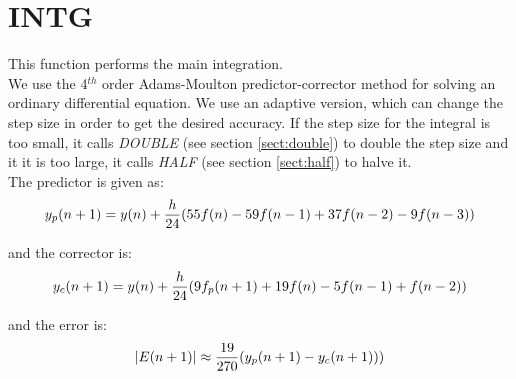 \section{INTG}
\label{sect:intg}

\noindent This function performs the main integration.\\


\noindent We use the 4$^{th}$ order Adams-Moulton predictor-corrector method
for solving an ordinary differential equation. We use an adaptive version,
which can change the step size in order to get the desired accuracy. If the
step size for the integral is too small, it calls {\em DOUBLE} (see section
\ref{sect:double}) to double the step size and it it is too large, it calls
{\em HALF} (see section \ref{sect:half}) to halve it.\\

\noindent The predictor is given as:\\

\begin{equation}
y_p(n+1) = y(n) + {h \over 24} (55 f(n) - 59 f(n-1) + 37 f(n-2) - 9 f(n-3))
\end{equation}

\noindent and the corrector is:\\

\begin{equation}
y_c(n+1) = y(n) + {h \over 24} (9 f_p(n+1) + 19 f(n) - 5 f(n-1) + f(n-2))
\end{equation}

\noindent and the error is:\\

\begin{equation}
|E(n+1)| \approx {19 \over 270} (y_p(n+1) - y_c(n+1)))
\end{equation}

